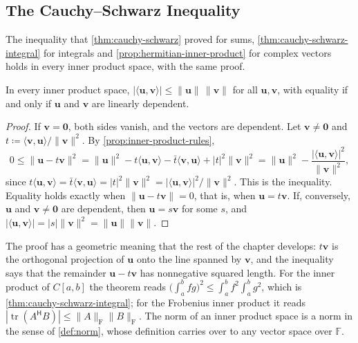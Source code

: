 \subsection{The Cauchy--Schwarz Inequality}

The inequality that \cref{thm:cauchy-schwarz} proved for sums, \cref{thm:cauchy-schwarz-integral} for integrals and \cref{prop:hermitian-inner-product} for complex vectors holds in every inner product space, with the same proof.

\begin{theorem}
\label{thm:cauchy-schwarz-general}
In every inner product space, $|\langle\mathbf u,\mathbf v\rangle|\le\|\mathbf u\|\,\|\mathbf v\|$ for all $\mathbf u,\mathbf v$, with equality if and only if $\mathbf u$ and $\mathbf v$ are linearly dependent.
\end{theorem}

\begin{proof}
If $\mathbf v=\mathbf 0$, both sides vanish, and the vectors are dependent. Let $\mathbf v\ne\mathbf 0$ and $t\coloneqq\langle\mathbf v,\mathbf u\rangle/\|\mathbf v\|^2$. By \cref{prop:inner-product-rules},
\[
0\le\|\mathbf u-t\mathbf v\|^2=\|\mathbf u\|^2-t\langle\mathbf u,\mathbf v\rangle-\bar t\langle\mathbf v,\mathbf u\rangle+|t|^2\|\mathbf v\|^2=\|\mathbf u\|^2-\frac{|\langle\mathbf u,\mathbf v\rangle|^2}{\|\mathbf v\|^2},
\]
since $t\langle\mathbf u,\mathbf v\rangle=\bar t\langle\mathbf v,\mathbf u\rangle=|t|^2\|\mathbf v\|^2=|\langle\mathbf u,\mathbf v\rangle|^2/\|\mathbf v\|^2$. This is the inequality. Equality holds exactly when $\|\mathbf u-t\mathbf v\|=0$, that is, when $\mathbf u=t\mathbf v$. If, conversely, $\mathbf u$ and $\mathbf v\ne\mathbf 0$ are dependent, then $\mathbf u=s\mathbf v$ for some $s$, and $|\langle\mathbf u,\mathbf v\rangle|=|s|\|\mathbf v\|^2=\|\mathbf u\|\|\mathbf v\|$.
\end{proof}

The proof has a geometric meaning that the rest of the chapter develops: $t\mathbf v$ is the orthogonal projection of $\mathbf u$ onto the line spanned by $\mathbf v$, and the inequality says that the remainder $\mathbf u-t\mathbf v$ has nonnegative squared length. For the inner product of $C[a,b]$ the theorem reads $\bigl(\int_a^bfg\bigr)^2\le\int_a^bf^2\int_a^bg^2$, which is \cref{thm:cauchy-schwarz-integral}; for the Frobenius inner product it reads $|\operatorname{tr}(A^{\mathsf H}B)|\le\|A\|_{\mathrm F}\|B\|_{\mathrm F}$. The norm of an inner product space is a norm in the sense of \cref{def:norm}, whose definition carries over to any vector space over $\mathbb F$.

